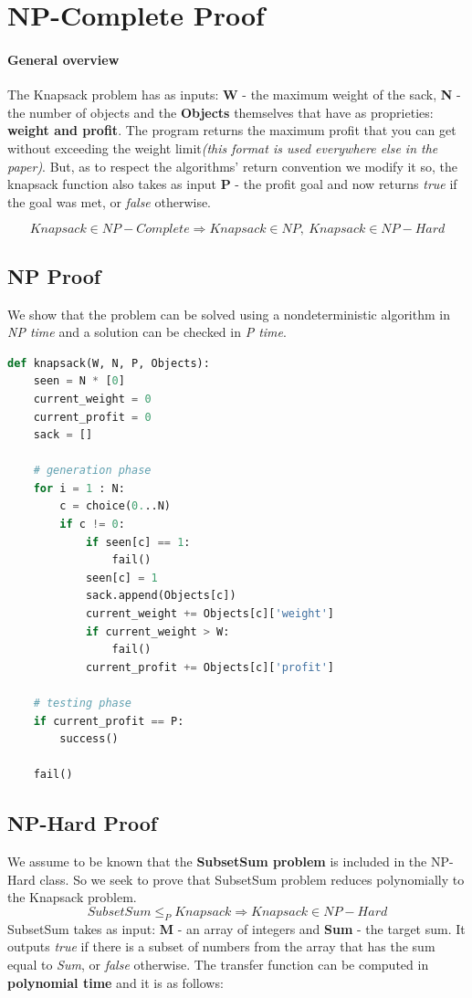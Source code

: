 \documentclass{llncs}
\begin{document}
\section{NP-Complete Proof}
\paragraph{General overview}
The Knapsack problem has as inputs: \textbf{W} - the maximum weight of the sack, \textbf{N} - the number of objects and the \textbf{Objects} themselves that have as proprieties: \textbf{weight and profit}. The program returns the maximum profit that you can get without exceeding the weight limit\textit{(this format is used everywhere else in the paper)}. But, as to respect the algorithms' return convention we modify it so, the knapsack function also takes as input \textbf{P} - the profit goal and now returns \textit{true} if the goal was met, or \textit{false} otherwise.  

\[
 Knapsack \in NP-Complete \Rightarrow Knapsack \in NP,\ Knapsack \in NP-Hard
\]
\subsection{NP Proof}
We show that the problem can be solved using a nondeterministic algorithm in \textit{NP time} and a solution can be checked in \textit{P time}.


\begin{lstlisting}[language=Python] 
def knapsack(W, N, P, Objects):
    seen = N * [0]
    current_weight = 0
    current_profit = 0
    sack = []

    # generation phase
    for i = 1 : N:
        c = choice(0...N)
        if c != 0:
            if seen[c] == 1:
                fail()
            seen[c] = 1
            sack.append(Objects[c])
            current_weight += Objects[c]['weight']
            if current_weight > W:
                fail()
            current_profit += Objects[c]['profit']

    # testing phase
    if current_profit == P:
        success()

    fail()
\end{lstlisting}

\subsection{NP-Hard Proof}
We assume to be known that the \textbf{SubsetSum problem} is included in the NP-Hard class. So we seek to prove that SubsetSum problem reduces polynomially to the Knapsack problem.
\[
Subset Sum \leq_{P} Knapsack \Rightarrow Knapsack \in NP-Hard
\]
SubsetSum takes as input: \textbf{M} - an array of integers and \textbf{Sum} - the target sum. It outputs \textit{true} if there is a subset of numbers from the array that has the sum equal to \textit{Sum}, or \textit{false} otherwise.
The transfer function can be computed in \textbf{polynomial time} and it is as follows:
\end{document}
